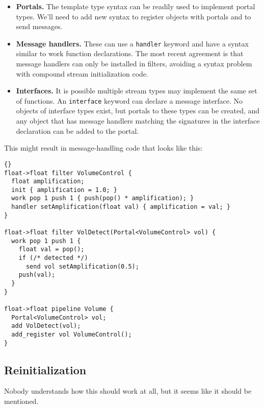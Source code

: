 \documentclass[11pt]{article}
\begin{document}
\begin{itemize}

\item \textbf{Portals.}  The template type syntax can be readily used
  to implement portal types.  We'll need to add new syntax to register
  objects with portals and to send messages.

\item \textbf{Message handlers.}  These can use a \lstinline|handler|
  keyword and have a syntax similar to work function declarations.
  The most recent agreement is that message handlers can only be
  installed in filters, avoiding a syntax problem with compound stream
  initialization code.

\item \textbf{Interfaces.}  It is possible multiple stream types may
  implement the same set of functions.  An \lstinline|interface|
  keyword can declare a message interface.  No objects of interface
  types exist, but portals to these types can be created, and any
  object that has message handlers matching the signatures in the
  interface declaration can be added to the portal.

\end{itemize}

This might result in message-handling code that looks like this:

\begin{lstlisting}{}
float->float filter VolumeControl {
  float amplification;
  init { amplification = 1.0; }
  work pop 1 push 1 { push(pop() * amplification); }
  handler setAmplification(float val) { amplification = val; }
}

float->float filter VolDetect(Portal<VolumeControl> vol) {
  work pop 1 push 1 {
    float val = pop();
    if (/* detected */)
      send vol setAmplification(0.5);
    push(val);
  }
}

float->float pipeline Volume {
  Portal<VolumeControl> vol;
  add VolDetect(vol);
  add_register vol VolumeControl();
}
\end{lstlisting}

\subsection{Reinitialization}

Nobody understands how this should work at all, but it seems like it
should be mentioned.
\end{document}
